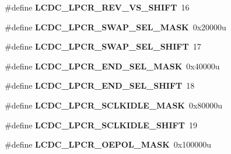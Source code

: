 \begin{DoxyCompactItemize}
\item 
\hypertarget{group___l_c_d_c___register___masks_ga58dc7a2a90d86bf5a040824aa110661c}{}\#define {\bfseries L\+C\+D\+C\+\_\+\+L\+P\+C\+R\+\_\+\+R\+E\+V\+\_\+\+V\+S\+\_\+\+S\+H\+I\+F\+T}~16\label{group___l_c_d_c___register___masks_ga58dc7a2a90d86bf5a040824aa110661c}

\item 
\hypertarget{group___l_c_d_c___register___masks_gaa9385f342b68394cacf55165bc4c4fbb}{}\#define {\bfseries L\+C\+D\+C\+\_\+\+L\+P\+C\+R\+\_\+\+S\+W\+A\+P\+\_\+\+S\+E\+L\+\_\+\+M\+A\+S\+K}~0x20000u\label{group___l_c_d_c___register___masks_gaa9385f342b68394cacf55165bc4c4fbb}

\item 
\hypertarget{group___l_c_d_c___register___masks_gaf2753aefc9017339ecc4a0c80ff5a5e7}{}\#define {\bfseries L\+C\+D\+C\+\_\+\+L\+P\+C\+R\+\_\+\+S\+W\+A\+P\+\_\+\+S\+E\+L\+\_\+\+S\+H\+I\+F\+T}~17\label{group___l_c_d_c___register___masks_gaf2753aefc9017339ecc4a0c80ff5a5e7}

\item 
\hypertarget{group___l_c_d_c___register___masks_gabc9c922a5b695b271dc42f7e7576013d}{}\#define {\bfseries L\+C\+D\+C\+\_\+\+L\+P\+C\+R\+\_\+\+E\+N\+D\+\_\+\+S\+E\+L\+\_\+\+M\+A\+S\+K}~0x40000u\label{group___l_c_d_c___register___masks_gabc9c922a5b695b271dc42f7e7576013d}

\item 
\hypertarget{group___l_c_d_c___register___masks_ga9049b2583ed71ae1e1f8d6722198e6a2}{}\#define {\bfseries L\+C\+D\+C\+\_\+\+L\+P\+C\+R\+\_\+\+E\+N\+D\+\_\+\+S\+E\+L\+\_\+\+S\+H\+I\+F\+T}~18\label{group___l_c_d_c___register___masks_ga9049b2583ed71ae1e1f8d6722198e6a2}

\item 
\hypertarget{group___l_c_d_c___register___masks_gadcc9510243042c5bb9f5d438b4049b32}{}\#define {\bfseries L\+C\+D\+C\+\_\+\+L\+P\+C\+R\+\_\+\+S\+C\+L\+K\+I\+D\+L\+E\+\_\+\+M\+A\+S\+K}~0x80000u\label{group___l_c_d_c___register___masks_gadcc9510243042c5bb9f5d438b4049b32}

\item 
\hypertarget{group___l_c_d_c___register___masks_ga75b55d0b6cade2de8fe6e83ec4d668ad}{}\#define {\bfseries L\+C\+D\+C\+\_\+\+L\+P\+C\+R\+\_\+\+S\+C\+L\+K\+I\+D\+L\+E\+\_\+\+S\+H\+I\+F\+T}~19\label{group___l_c_d_c___register___masks_ga75b55d0b6cade2de8fe6e83ec4d668ad}

\item 
\hypertarget{group___l_c_d_c___register___masks_ga82c6b4c0571026ca83c04fe5d96d9fd1}{}\#define {\bfseries L\+C\+D\+C\+\_\+\+L\+P\+C\+R\+\_\+\+O\+E\+P\+O\+L\+\_\+\+M\+A\+S\+K}~0x100000u\label{group___l_c_d_c___register___masks_ga82c6b4c0571026ca83c04fe5d96d9fd1}


\end{DoxyCompactItemize}
